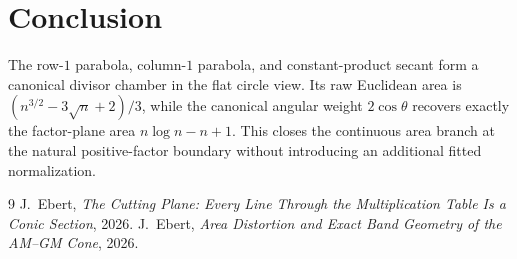 \documentclass[11pt]{amsart}
\theoremstyle{remark}
\begin{document}
\section{Conclusion}
The row-$1$ parabola, column-$1$ parabola, and constant-product secant form a canonical divisor chamber in the flat circle view. Its raw Euclidean area is $(n^{3/2}-3\sqrt n+2)/3$, while the canonical angular weight $2\cos\theta$ recovers exactly the factor-plane area $n\log n-n+1$. This closes the continuous area branch at the natural positive-factor boundary without introducing an additional fitted normalization.

\begin{thebibliography}{9}
 J.~Ebert, \emph{The Cutting Plane: Every Line Through the Multiplication Table Is a Conic Section}, 2026.
 J.~Ebert, \emph{Area Distortion and Exact Band Geometry of the AM--GM Cone}, 2026.
\end{thebibliography}
\end{document}
